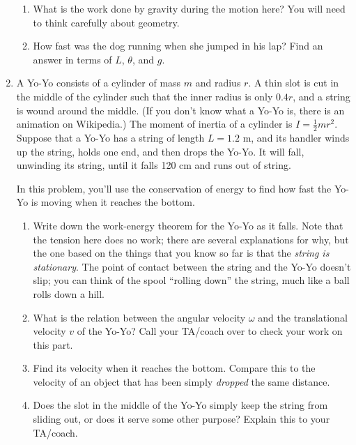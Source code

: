 \documentclass[12pt]{article}
\begin{document}
\begin{enumerate}
\begin{enumerate}
\item What is the work done by gravity during the motion here? You will need to think carefully about geometry.

\vspace{3in}

\item How fast was the dog running when she jumped in his lap? Find an answer in terms of $L$, $\theta$, and $g$.

\end{enumerate}

\newpage

\item A Yo-Yo consists of a cylinder of mass $m$ and radius $r$. A thin slot is cut in the middle of the cylinder such that the inner radius is only $0.4r$, and a string is wound around the middle. (If you don't know what a Yo-Yo is, there is an animation on Wikipedia.) The moment of inertia of a cylinder is $I=\frac{1}{2}mr^2$. Suppose that a Yo-Yo has a string of length $L=1.2$ m, and its handler winds up the string, holds one end, and then drops the Yo-Yo. It will fall, unwinding its string,
until it falls 120 cm and runs out of string.

In this problem, you'll use the conservation of energy to find how fast the Yo-Yo is moving when it reaches the bottom.

\begin{enumerate}

\item Write down the work-energy theorem for the Yo-Yo as it falls. Note that the tension here does no work; there are several explanations for why, but the one based on the things that you know so far is that the {\it string is stationary}. 
The point of contact between the string and the Yo-Yo doesn't slip; you can think of the spool ``rolling down'' the string, much like a ball rolls down a hill.

\vspace{3.5in}

\item What is the relation between the angular velocity $\omega$ and the translational velocity $v$ of the Yo-Yo? Call your TA/coach over to check your work on this part.

\vspace{3.5in}

\newpage

\item Find its velocity when it reaches the bottom. Compare this to the velocity of an object that has been simply {\it dropped} the same distance.

\vspace{3.5in}

\item Does the slot in the middle of the Yo-Yo simply keep the string from sliding out, or does it serve some other purpose? Explain this to your TA/coach.

\end{enumerate}
\end{enumerate}
\end{document}
